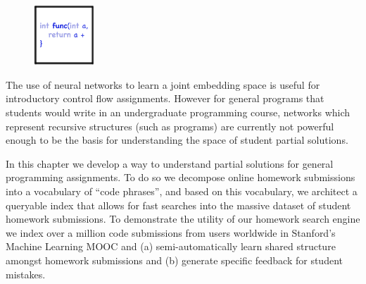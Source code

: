 \begin{figure}[h!]
\includegraphics[width=0.2\textwidth]{img/assnType_4}
\end{figure}

The use of neural networks to learn a joint embedding space is useful for introductory control flow assignments. However for general programs that students would write in an undergraduate programming course, networks which represent recursive structures (such as programs) are currently not powerful enough to be the basis for understanding the space of student partial solutions.

In this chapter we develop a way to understand partial solutions for general programming assignments. To do so we decompose online homework submissions into a vocabulary of ``code phrases'', and based on this vocabulary, we architect a queryable index that allows for fast searches into the massive dataset of student homework submissions. To demonstrate the utility of our homework search engine we index over a million code submissions from users worldwide in Stanford's Machine Learning MOOC and (a) semi-automatically learn shared structure amongst homework submissions and (b)  generate specific feedback for student mistakes. 


